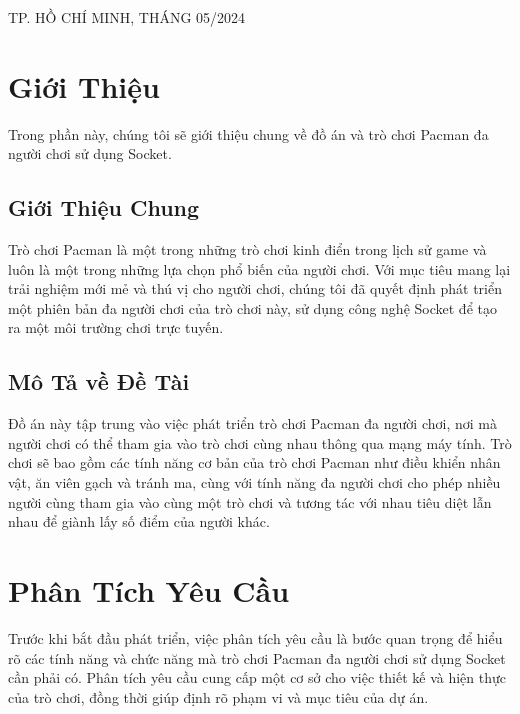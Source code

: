 \documentclass[a4paper]{article}
\begin{document}
\begin{titlepage}
\begin{center}

{\footnotesize TP. HỒ CHÍ MINH, THÁNG 05/2024}
\end{center}


\end{titlepage}


\thispagestyle{empty}

\newpage
\tableofcontents
\newpage



\section{Giới Thiệu}

Trong phần này, chúng tôi sẽ giới thiệu chung về đồ án và trò chơi Pacman đa người chơi sử dụng Socket.

\subsection{Giới Thiệu Chung}

Trò chơi Pacman là một trong những trò chơi kinh điển trong lịch sử game và luôn là một trong những lựa chọn phổ biến của người chơi. Với mục tiêu mang lại trải nghiệm mới mẻ và thú vị cho người chơi, chúng tôi đã quyết định phát triển một phiên bản đa người chơi của trò chơi này, sử dụng công nghệ Socket để tạo ra một môi trường chơi trực tuyến.

\subsection{Mô Tả về Đề Tài}

Đồ án này tập trung vào việc phát triển trò chơi Pacman đa người chơi, nơi mà người chơi có thể tham gia vào trò chơi cùng nhau thông qua mạng máy tính. Trò chơi sẽ bao gồm các tính năng cơ bản của trò chơi Pacman như điều khiển nhân vật, ăn viên gạch và tránh ma, cùng với tính năng đa người chơi cho phép nhiều người cùng tham gia vào cùng một trò chơi và tương tác với nhau tiêu diệt lẫn nhau để giành lấy số điểm của người khác.




\newpage
\section{Phân Tích Yêu Cầu}

Trước khi bắt đầu phát triển, việc phân tích yêu cầu là bước quan trọng để hiểu rõ các tính năng và chức năng mà trò chơi Pacman đa người chơi sử dụng Socket cần phải có. Phân tích yêu cầu cung cấp một cơ sở cho việc thiết kế và hiện thực của trò chơi, đồng thời giúp định rõ phạm vi và mục tiêu của dự án.
\end{document}
